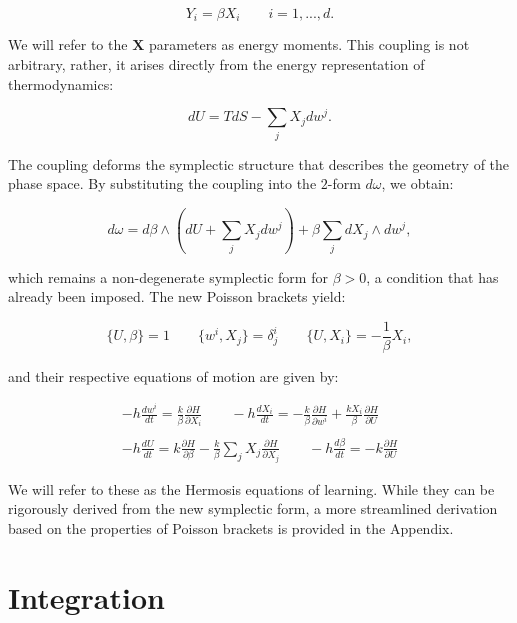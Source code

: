 \documentclass[12pt]{article}
\begin{document}
\begin{equation}
Y_{i} = \beta X_{i} \qquad i = 1, ..., d.
\end{equation}

We will refer to the $\mathbf{X}$ parameters as energy moments. This coupling is not arbitrary, rather, it arises directly from the energy representation of thermodynamics:

\begin{equation}
dU = T dS - \sum_{j} X_{j} dw^{j}.
\end{equation}

The coupling deforms the symplectic structure that describes the geometry of the phase space. By substituting the coupling into the $2$-form $d\omega$, we obtain:

\begin{equation}
d\omega = d\beta \wedge (dU +\sum_{j}X_{j}dw^{j}) + \beta\sum_{j} dX_{j} \wedge dw^{j},
\end{equation}

which remains a non-degenerate symplectic form for $\beta > 0$, a condition that has already been imposed. The new Poisson brackets yield:

\begin{equation}
\{U, \beta \} = 1 \qquad \{w^{i}, X_{j}\} = \delta^{i}_j \qquad \{U, X_{i}\} = -\frac{1}{\beta}X_{i},
\end{equation}

and their respective equations of motion are given by:

\begin{equation}
\begin{aligned}
-h\frac{dw^{i}}{dt} = \frac{k}{\beta} \frac{\partial H}{\partial X_{i}} \qquad -h\frac{dX_{i}}{dt} = -\frac{k}{\beta} \frac{\partial H}{\partial w^{i}} + \frac{k X_{i}}{\beta} \frac{\partial H}{\partial U}
\\
\\
-h\frac{dU}{dt} = k \frac{\partial H}{\partial \beta} - \frac{k}{\beta} \sum_{j} X_{j} \frac{\partial H}{\partial X_{j}} \qquad -h\frac{d\beta}{dt} = -k\frac{\partial H}{\partial U} 
\end{aligned}
\end{equation}

We will refer to these as the Hermosis equations of learning. While they can be rigorously derived from the new symplectic form, a more streamlined derivation based on the properties of Poisson brackets is provided in the Appendix.

\section*{Integration}
\end{document}
